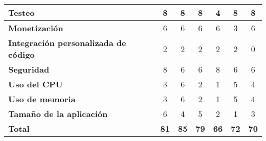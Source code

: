 \begin{spacing}{1}
\begin{small}
\begin{center}
\begin{longtable}[c]{ |>{\bfseries}p{}  |p{} |p{}  |p{}  |p{}  |p{}  |p{}|   }
                \hline
                Testeo                                 & \multicolumn{1}{c|}{8}              & \multicolumn{1}{c|}{8}                      & \multicolumn{1}{c|}{8}                 & \multicolumn{1}{c|}{4}  & \multicolumn{1}{c|}{8}  & \multicolumn{1}{c|}{8}  \\
                \hline
                Monetización                           & \multicolumn{1}{c|}{6}              & \multicolumn{1}{c|}{6}                      & \multicolumn{1}{c|}{6}                 & \multicolumn{1}{c|}{6}  & \multicolumn{1}{c|}{3}  & \multicolumn{1}{c|}{6}  \\
                \hline
                Integración personalizada de código    & \multicolumn{1}{c|}{2}              & \multicolumn{1}{c|}{2}                      & \multicolumn{1}{c|}{2}  & \multicolumn{1}{c|}{2}  & \multicolumn{1}{c|}{2}  & \multicolumn{1}{c|}{0}  \\
                \hline
                Seguridad                              & \multicolumn{1}{c|}{8}              & \multicolumn{1}{c|}{6}                      & \multicolumn{1}{c|}{6}                 & \multicolumn{1}{c|}{8}  & \multicolumn{1}{c|}{6}  & \multicolumn{1}{c|}{6}  \\
                \hline
                Uso del CPU                            & \multicolumn{1}{c|}{3}              & \multicolumn{1}{c|}{6}                      & \multicolumn{1}{c|}{2}                 & \multicolumn{1}{c|}{1}  & \multicolumn{1}{c|}{5}  & \multicolumn{1}{c|}{4}  \\
                \hline
                Uso de memoria                         & \multicolumn{1}{c|}{3}              & \multicolumn{1}{c|}{6}                      & \multicolumn{1}{c|}{2}  & \multicolumn{1}{c|}{1}  & \multicolumn{1}{c|}{5}  & \multicolumn{1}{c|}{4}  \\
                \hline
                Tamaño de la aplicación                & \multicolumn{1}{c|}{6}              & \multicolumn{1}{c|}{4}                      & \multicolumn{1}{c|}{5}  & \multicolumn{1}{c|}{2}  & \multicolumn{1}{c|}{1}  & \multicolumn{1}{c|}{3}  \\
                \hline
                \textbf{Total}                         & \multicolumn{1}{c|}{\textbf{81}}    & \multicolumn{1}{c|}{\textbf{85}}            & \multicolumn{1}{c|}{\textbf{79}}                           & \multicolumn{1}{c|}{\textbf{66}}                                & \multicolumn{1}{c|}{\textbf{72}}                        & \multicolumn{1}{c|}{\textbf{70}}                           \\
                \hline
            \end{longtable}
        \end{center}
    \end{small}
\end{spacing}


